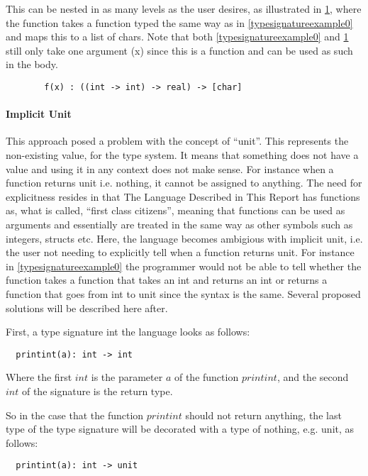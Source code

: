 This can be nested in as many levels as the user desires, as illustrated in \cref{typesignatureexample1}, where the function takes a function typed the same way as in \cref{typesignatureexample0} and maps this to a list of chars. Note that both \cref{typesignatureexample0} and \cref{typesignatureexample1} still only take one argument (x) since this is a function and can be used as such in the body.

\begin{figure}
\begin{lstlisting}
  f(x) : ((int -> int) -> real) -> [char]
\end{lstlisting}
\caption{}
\label{typesignatureexample1}
\end{figure}

\paragraph{Implicit Unit}
This approach posed a problem with the concept of \enquote{unit}. This represents the non-existing value, for the type system. It means that something does not have a value and using it in any context does not make sense. For instance when a function returns unit i.e. nothing, it cannot be assigned to anything. The need for explicitness resides in that The Language Described in This Report has functions as, what is called, \enquote{first class citizens}, meaning that functions can be used as arguments and essentially are treated in the same way as other symbols such as integers, structs etc. Here, the language becomes ambigious with implicit unit, i.e. the user not needing to explicitly tell when a function returns unit. For instance in \cref{typesignatureexample0} the programmer would not be able to tell whether the function takes a function that takes an int and returns an int or returns a function that goes from int to unit since the syntax is the same.
Several proposed solutions will be described here after.

First, a type signature int the language looks as follows:
\begin{verbatim}
  printint(a): int -> int
\end{verbatim}
Where the first $int$ is the parameter $a$ of the function $printint$, and the second $int$ of the signature is the return type.

So in the case that the function $printint$ should not return anything, the last type of the type signature will be decorated with a type of nothing, e.g. unit, as follows:
\begin{verbatim}
  printint(a): int -> unit
\end{verbatim}

